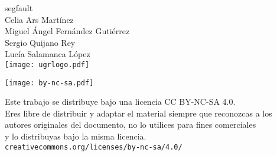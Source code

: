 \documentclass[10pt, a4paper]{article}
\theoremstyle{theorem-style}
\theoremstyle{theorem-style}
\theoremstyle{definition-style}
\theoremstyle{remark-style}
\theoremstyle{example-style}
\theoremstyle{definition-style}
\theoremstyle{remark-style}
\newcommand{\autor}{Celia Ars Martínez\\Miguel Ángel Fernández Gutiérrez\\Sergio Quijano Rey\\Lucía Salamanca López}
\newcommand{\grado}{segfault}
\begin{document}

\afterpage{\restorepagecolor} %
\begin{titlepage}

	\parbox[t]{\textwidth}{
			\raggedright %
			\fontsize{40pt}{40pt}\selectfont\sffamily{}
	}

	\vfill

	\parbox[t]{\textwidth}{
		\raggedright %
		\sffamily\large\color{white}
		\grado\\
		{\Large \autor }\\[15pt]
		\texttt{[image: ugrlogo.pdf]}
	}

\end{titlepage}


\thispagestyle{empty}
\null
\vfill

\parbox[t]{\textwidth}{
  \texttt{[image: by-nc-sa.pdf]}\\[4pt]
  \raggedright %
  \sffamily\large
  {\Large Este trabajo se distribuye bajo una licencia CC BY-NC-SA 4.0.}\\[4pt]
  Eres libre de distribuir y adaptar el material siempre que reconozcas a los\\
  autores originales del documento, no lo utilices para fines comerciales\\
  y lo distribuyas bajo la misma licencia.\\[4pt]
  \texttt{creativecommons.org/licenses/by-nc-sa/4.0/}
}

\end{document}
